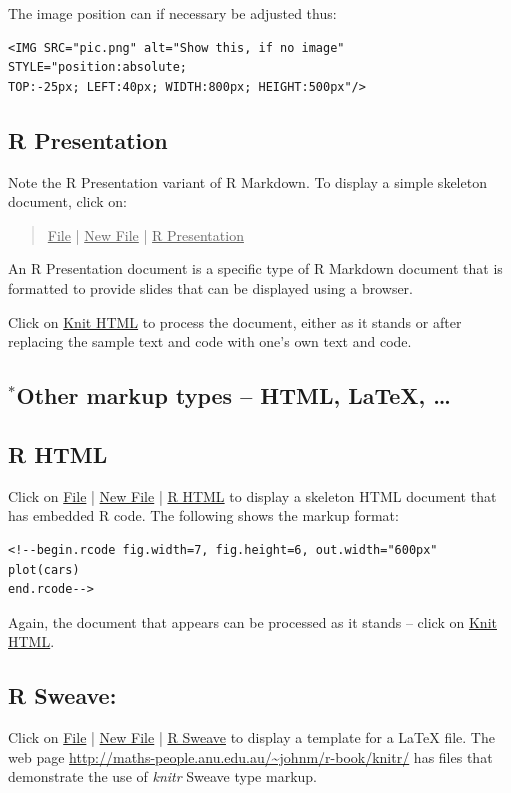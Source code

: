The image position can if necessary be adjusted thus:
\begin{verbatim}
<IMG SRC="pic.png" alt="Show this, if no image" STYLE="position:absolute;
TOP:-25px; LEFT:40px; WIDTH:800px; HEIGHT:500px"/>
\end{verbatim}

\subsection*{R Presentation}

Note the R Presentation variant of R Markdown.
To display a simple skeleton  document, click on:
\begin{quote}
\underline{File} | \underline{New File} | \underline{R Presentation}
\end{quote}
An R Presentation document is a specific type of R Markdown document
that is formatted to provide slides that can be displayed using a
browser.

Click on \underline{Knit HTML} to process the document, either as it
stands or after replacing the sample text and code with one's own text
and code.

\subsection{$^*$Other markup types -- HTML,  LaTeX, \ldots}

\subsection*{R HTML}

Click on \underline{File} | \underline{New File} | \underline{R HTML}
to display a skeleton HTML document that has embedded R code.
The following shows the markup format:
\begin{verbatim}
<!--begin.rcode fig.width=7, fig.height=6, out.width="600px"
plot(cars)
end.rcode-->
\end{verbatim}

Again, the document that appears can be processed as it stands --
click on \underline{Knit HTML}.

\subsection*{R Sweave: }

Click on \underline{File} | \underline{New
  File} | \underline{R Sweave} to display a template for a LaTeX file.
The web page \url{http://maths-people.anu.edu.au/~johnm/r-book/knitr/} has
files that demonstrate the use of {\em knitr} Sweave type markup.

